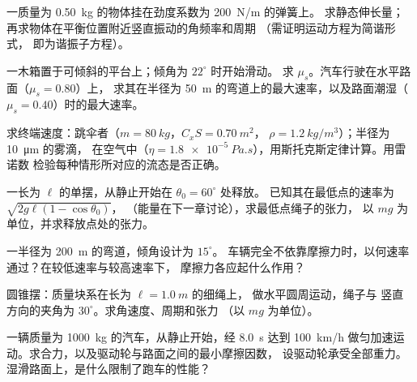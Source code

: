 \begin{exercise}[$\star$]\label{exo:b1:newton-dynamics:4}
一质量为 \qty{0.50}{kg} 的物体挂在劲度系数为 \qty{200}{N/m} 的弹簧上。
求静态伸长量；再求物体在平衡位置附近竖直振动的角频率和周期
（需证明运动方程为简谐形式，
即为谐振子方程）。
\end{exercise}

\begin{exercise}[$\star\star$]\label{exo:b1:newton-dynamics:5}
一木箱置于可倾斜的平台上；倾角为 $22^\circ$ 时开始滑动。
求 $\mu_s$。汽车行驶在水平路面（$\mu_s = 0.80$）上，
求其在半径为 \qty{50}{m} 的弯道上的最大速率，以及路面潮湿（$\mu_s = 0.40$）时的最大速率。
\end{exercise}

\begin{exercise}[$\star\star$]\label{exo:b1:newton-dynamics:6}
求终端速度：跳伞者（$m = \qty{80}{kg}$，$C_xS = \qty{0.70}{m^2}$，
$\rho = \qty{1.2}{kg/m^3}$）；半径为 \qty{10}{\micro m} 的雾滴，
在空气中（$\eta = \qty{1.8e-5}{Pa.s}$），用斯托克斯定律计算。用雷诺数
检验每种情形所对应的流态是否正确。
\end{exercise}

\begin{exercise}[$\star\star$]\label{exo:b1:newton-dynamics:7}
一长为 $\ell$ 的单摆，从静止开始在 $\theta_0 = 60^\circ$ 处释放。
已知其在最低点的速率为 $\sqrt{2g\ell(1 - \cos\theta_0)}$，
（能量在下一章讨论），求最低点绳子的张力，
以 $mg$ 为单位，并求释放点处的张力。
\end{exercise}

\begin{exercise}[$\star\star$]\label{exo:b1:newton-dynamics:8}
一半径为 \qty{200}{m} 的弯道，倾角设计为 $15^\circ$。
车辆完全不依靠摩擦力时，以何速率通过？在较低速率与较高速率下，
摩擦力各应起什么作用？
\end{exercise}

\begin{exercise}[$\star\star$]\label{exo:b1:newton-dynamics:9}
圆锥摆：质量块系在长为 $\ell = \qty{1.0}{m}$ 的细绳上，
做水平圆周运动，绳子与
竖直方向的夹角为 $30^\circ$。求角速度、周期和张力
（以 $mg$ 为单位）。
\end{exercise}

\begin{exercise}[$\star\star\star$]\label{exo:b1:newton-dynamics:10}
一辆质量为 \qty{1000}{kg} 的汽车，从静止开始，经 \qty{8.0}{s} 达到 \qty{100}{km/h}
做匀加速运动。求合力，以及驱动轮与路面之间的最小摩擦因数，
设驱动轮承受全部重力。
湿滑路面上，是什么限制了跑车的性能？
\end{exercise}

